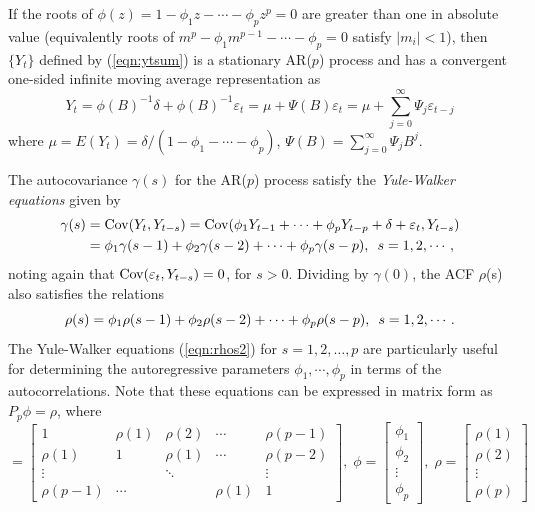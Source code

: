 \begin{thm}
If the roots of $\phi(z) = 1- \phi_1z - \cdots - \phi_pz^p = 0$ are greater than one in absolute value (equivalently roots of $m^p - \phi_1m^{p-1} - \cdots - \phi_p = 0$ satisfy $\lvert m_i\rvert<1$), then $\{Y_t\}$ defined by (\ref{eqn:ytsum}) is a stationary AR($p$) process and has a convergent one-sided infinite moving average representation as
	\begin{equation}\label{eqn:ytthm}
	Y_t= \phi(B)^{-1}\delta + \phi(B)^{-1}\varepsilon_t= \mu + \Psi(B)\varepsilon_t= \mu + \sum_{j=0}^\infty\Psi_j\varepsilon_{t-j}
	\end{equation}
where $\mu = E(Y_t) = \delta/(1 - \phi_1 - \cdots - \phi_p)$, $\Psi(B) = \sum_{j=0}^\infty\Psi_jB^j$. 
\end{thm}


The autocovariance $\gamma(s)$ for the AR($p$) process satisfy the \textit{Yule-Walker equations} given by
	\begin{equation*}
	\begin{split}
	\gamma(s)&= \operatorname{Cov}(Y_t,Y_{t-s})= \operatorname{Cov}(\phi_1Y_{t-1} + \cdots + \phi_pY_{t-p} + \delta + \varepsilon_t, Y_{t-s}) \\
& = \phi_1\gamma(s-1) + \phi_2\gamma(s-2) + \cdots + \phi_p\gamma(s-p),\enskip s=1,2,\cdots,
	\end{split}
	\end{equation*}
noting again that $\operatorname{Cov}(\varepsilon_t,Y_{t-s})= 0$, for $s>0$. Dividing by $\gamma(0)$, the ACF $\rho$(s) also satisfies the relations
	\begin{equation}\label{eqn:rhos2}
	\rho(s) = \phi_1\rho(s-1) + \phi_2\rho(s-2) + \cdots + \phi_p\rho(s-p),\enskip s=1,2,\cdots.
	\end{equation}
The Yule-Walker equations (\ref{eqn:rhos2}) for $s=1,2,\ldots,p$ are particularly useful for determining the autoregressive parameters $\phi_1,\cdots,\phi_p$ in terms of the autocorrelations. Note that these equations can be expressed in matrix form as $P_p\phi = \rho$, where
	\begin{equation}\label{eqn:matrix}
	=\begin{bmatrix}
	1 & \rho(1) & \rho(2) & \cdots & \rho(p-1) \\
	\rho(1) & 1 & \rho(1) & \cdots & \rho(p-2)\\
	\vdots & & \ddots & & \vdots \\
	\rho(p-1) & \cdots & & \rho(1) & 1
	\end{bmatrix}, \;
	\phi=\begin{bmatrix} \phi_1 \\ \phi_2 \\ \vdots \\ \phi_p \end{bmatrix}, \;
	\rho=\begin{bmatrix} \rho(1) \\ \rho(2) \\ \vdots \\ \rho(p) \end{bmatrix} 
	\end{equation}

